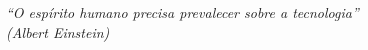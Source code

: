 \begin{epigrafe}
    \vspace*{\fill}
    \begin{flushright}
        \textit{``O espírito humano precisa prevalecer sobre a tecnologia''\\
        (Albert Einstein)}
    \end{flushright}
\end{epigrafe}
